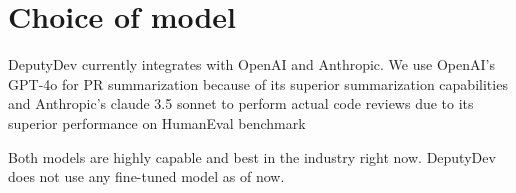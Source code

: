\section{Choice of model}
DeputyDev currently integrates with OpenAI and Anthropic. We use OpenAI's GPT-4o for PR summarization because of its superior summarization capabilities and Anthropic's claude 3.5 sonnet to perform actual code reviews due to its superior performance on HumanEval benchmark \cite{anthropic}

Both models are highly capable and best in the industry right now. DeputyDev does not use any fine-tuned model as of now.